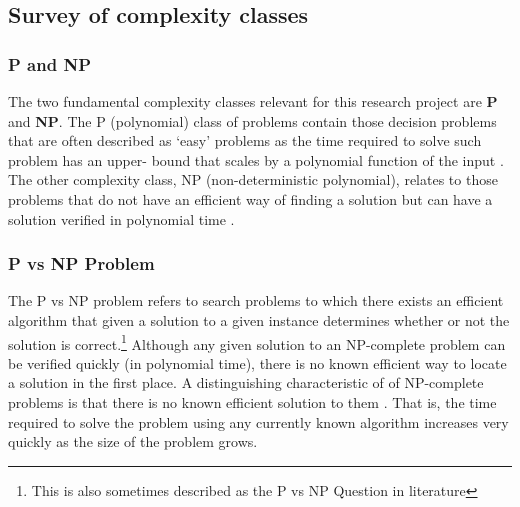 \documentclass[11pt, a4paper, oneside]{report} %
\begin{document}
\subsection{Survey of complexity classes}

\subsubsection{P and NP}

The two fundamental complexity classes relevant for this research project are \textbf{P} and
\textbf{NP}\@. The P (polynomial) class of problems contain those decision problems that are often
described as `easy' problems \cite{kendall2008survey} as the time required to solve such problem has
an upper- bound that scales by a polynomial function of the input \cite{sipser2012introduction}. The
other complexity class, NP (non-deterministic polynomial), relates to those problems that do not
have an efficient way of finding a solution but can have a solution verified in polynomial time
\cite{Goldreich:2008, Papadimitriou:2003:CC:1074100.1074233}.





\subsubsection{P vs NP Problem}


The P vs NP problem refers to search problems to which there exists an efficient algorithm that
given a solution to a given instance determines whether or not the solution is
correct\cite{sipser2012introduction,Goldreich:2008,kendall2008survey,du2011theory}.\footnote{This is
also sometimes described as the P vs NP Question in literature} Although any given solution to an
NP-complete problem can be verified quickly (in polynomial time), there is no known efficient way to
locate a solution in the first place. A distinguishing characteristic of of NP-complete problems is
that there is no known efficient solution to them \cite{Goldreich:2008}. That is, the time required to
solve the problem using any currently known algorithm increases very quickly as the size of the
problem grows.
\end{document}
